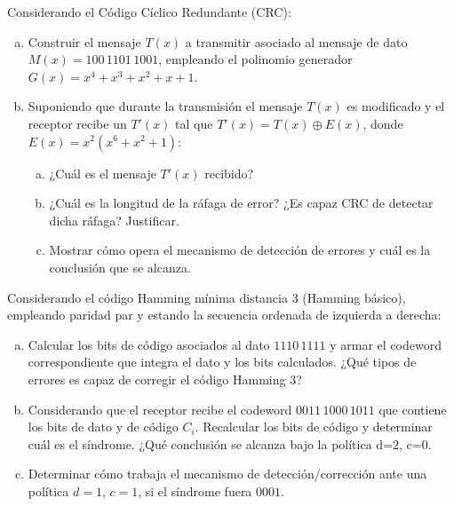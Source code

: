 \documentclass[12pt,a4paper]{article}
\begin{document}
 Considerando el Código Cíclico Redundante (CRC):
\begin{enumerate}[a)]
	\item Construir el mensaje $T(x)$ a transmitir asociado al mensaje de dato $M(x) = 100\,1101\,1001$, empleando el polinomio generador $G(x) = x^4 + x^3 + x^2 + x + 1$.

	\item Suponiendo que durante la transmisión el mensaje $T(x)$ es modificado y el receptor recibe un $T'(x)$ tal que $T'(x) = T(x) \oplus E(x)$, donde $E(x) = x^2 (x^6 + x^2 + 1)$:
	\begin{enumerate}[b.1)]
		\item ¿Cuál es el mensaje $T'(x)$ recibido?
		\item ¿Cuál es la longitud de la ráfaga de error? ¿Es capaz CRC de detectar dicha ráfaga? Justificar.
		\item Mostrar cómo opera el mecanismo de detección de errores y cuál es la conclusión que se alcanza.
	\end{enumerate} 
\end{enumerate}

 Considerando el código Hamming mínima distancia 3 (Hamming básico), empleando paridad par y estando la secuencia ordenada de izquierda a derecha:
\begin{enumerate}[a)]

	\item Calcular los bits de código asociados al dato \textbf{$1110\,1111$} y armar el codeword correspondiente que integra el dato y los bits calculados. ¿Qué tipos de errores es capaz de corregir el código Hamming 3?

	\item Considerando que el receptor recibe el codeword \textbf{$0011\,1000\,1011$} que contiene los bits de dato y de código \emph{$C_i$}. Recalcular los bits de código y determinar cuál es el síndrome. ¿Qué conclusión se alcanza bajo la política d=2, c=0.

	\item Determinar cómo trabaja el mecanismo de detección/corrección ante una política $d=1$, $c=1$,  si el síndrome fuera \textbf{$0001$}.

\end{enumerate}
\end{document}

